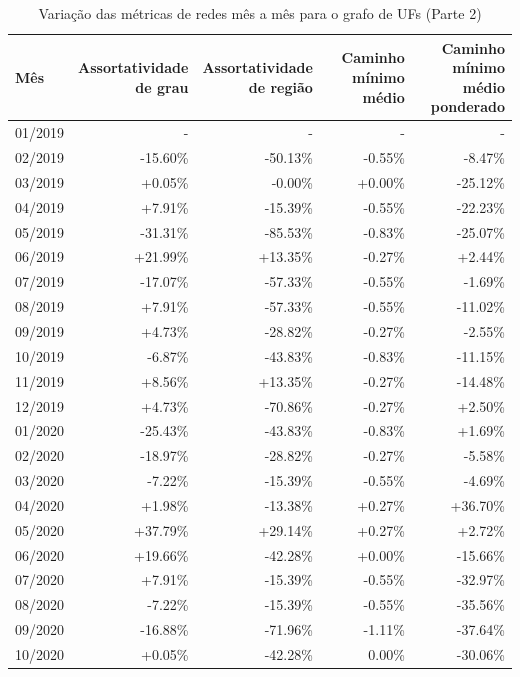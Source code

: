 \begin{table}[htb]
\centering
\caption{Variação das métricas de redes mês a mês para o grafo de UFs (Parte 2)}
\label{tab:metricas-redes-pandemia:grafo-mensal-por-uf2}
\begin{tabular}{l|rrrr}
\toprule
Mês & \shortstack{Assortatividade\\de grau} & \shortstack{Assortatividade\\de região} & \shortstack{Caminho mínimo\\médio} & \shortstack{Caminho mínimo\\médio ponderado} \\
\midrule
01/2019 & - & - & - & - \\
02/2019 & -15.60\% & -50.13\% & -0.55\% &  -8.47\% \\
03/2019 &  +0.05\% &  -0.00\% & +0.00\% & -25.12\% \\
04/2019 &  +7.91\% & -15.39\% & -0.55\% & -22.23\% \\
05/2019 & -31.31\% & -85.53\% & -0.83\% & -25.07\% \\
06/2019 & +21.99\% & +13.35\% & -0.27\% &  +2.44\% \\
07/2019 & -17.07\% & -57.33\% & -0.55\% &  -1.69\% \\
08/2019 &  +7.91\% & -57.33\% & -0.55\% & -11.02\% \\
09/2019 &  +4.73\% & -28.82\% & -0.27\% &  -2.55\% \\
10/2019 &  -6.87\% & -43.83\% & -0.83\% & -11.15\% \\
11/2019 &  +8.56\% & +13.35\% & -0.27\% & -14.48\% \\
12/2019 &  +4.73\% & -70.86\% & -0.27\% &  +2.50\% \\
01/2020 & -25.43\% & -43.83\% & -0.83\% &  +1.69\% \\
02/2020 & -18.97\% & -28.82\% & -0.27\% &  -5.58\% \\
03/2020 &  -7.22\% & -15.39\% & -0.55\% &  -4.69\% \\
04/2020 &  +1.98\% & -13.38\% & +0.27\% & +36.70\% \\
05/2020 & +37.79\% & +29.14\% & +0.27\% &  +2.72\% \\
06/2020 & +19.66\% & -42.28\% & +0.00\% & -15.66\% \\
07/2020 &  +7.91\% & -15.39\% & -0.55\% & -32.97\% \\
08/2020 &  -7.22\% & -15.39\% & -0.55\% & -35.56\% \\
09/2020 & -16.88\% & -71.96\% & -1.11\% & -37.64\% \\
10/2020 &  +0.05\% & -42.28\% &  0.00\% & -30.06\% \\
\bottomrule
\end{tabular}
\fdadospesquisa
\end{table}

